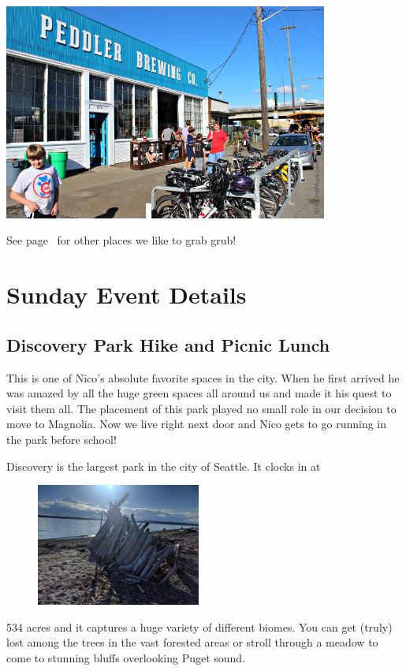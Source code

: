 \documentclass[10pt]{article}
\begin{document}
        \begin{center}
            \includegraphics[width=0.8\textwidth]{peddler}
        \end{center}
    
    See page~\pageref{subsec-bites} for other places we like to grab grub! 



\newpage
\section{Sunday Event Details}
\subsection{Discovery Park Hike and Picnic Lunch}
This is one of Nico's absolute favorite spaces in the city. When he first arrived he was amazed 
by all the huge green spaces all around us and made it his quest to visit them all. The placement of 
this park played no small role in our decision to move to Magnolia. Now we live right next door and Nico gets to go running in the park
before school!\hfill
\label{subsec-discovery}

Discovery is the largest park in the city of Seattle. It clocks in at  
\begin{figure}
    \begin{center}
        \includegraphics[width=0.48\textwidth]{leanto}
    \end{center}
\end{figure}
534 acres and it captures
a huge variety of different biomes. You can get (truly) lost among the trees in the vast
forested areas or stroll through a meadow to come to stunning bluffs overlooking Puget sound.
\end{document}
